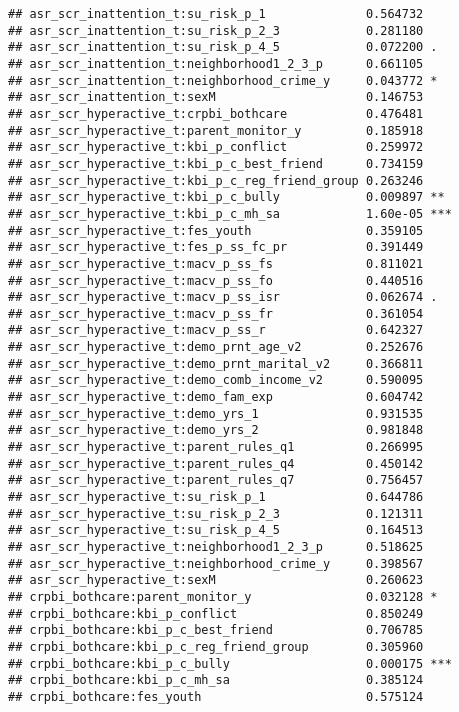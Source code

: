 \documentclass[
]{article}
\begin{document}
\begin{verbatim}
## asr_scr_inattention_t:su_risk_p_1              0.564732    
## asr_scr_inattention_t:su_risk_p_2_3            0.281180    
## asr_scr_inattention_t:su_risk_p_4_5            0.072200 .  
## asr_scr_inattention_t:neighborhood1_2_3_p      0.661105    
## asr_scr_inattention_t:neighborhood_crime_y     0.043772 *  
## asr_scr_inattention_t:sexM                     0.146753    
## asr_scr_hyperactive_t:crpbi_bothcare           0.476481    
## asr_scr_hyperactive_t:parent_monitor_y         0.185918    
## asr_scr_hyperactive_t:kbi_p_conflict           0.259972    
## asr_scr_hyperactive_t:kbi_p_c_best_friend      0.734159    
## asr_scr_hyperactive_t:kbi_p_c_reg_friend_group 0.263246    
## asr_scr_hyperactive_t:kbi_p_c_bully            0.009897 ** 
## asr_scr_hyperactive_t:kbi_p_c_mh_sa            1.60e-05 ***
## asr_scr_hyperactive_t:fes_youth                0.359105    
## asr_scr_hyperactive_t:fes_p_ss_fc_pr           0.391449    
## asr_scr_hyperactive_t:macv_p_ss_fs             0.811021    
## asr_scr_hyperactive_t:macv_p_ss_fo             0.440516    
## asr_scr_hyperactive_t:macv_p_ss_isr            0.062674 .  
## asr_scr_hyperactive_t:macv_p_ss_fr             0.361054    
## asr_scr_hyperactive_t:macv_p_ss_r              0.642327    
## asr_scr_hyperactive_t:demo_prnt_age_v2         0.252676    
## asr_scr_hyperactive_t:demo_prnt_marital_v2     0.366811    
## asr_scr_hyperactive_t:demo_comb_income_v2      0.590095    
## asr_scr_hyperactive_t:demo_fam_exp             0.604742    
## asr_scr_hyperactive_t:demo_yrs_1               0.931535    
## asr_scr_hyperactive_t:demo_yrs_2               0.981848    
## asr_scr_hyperactive_t:parent_rules_q1          0.266995    
## asr_scr_hyperactive_t:parent_rules_q4          0.450142    
## asr_scr_hyperactive_t:parent_rules_q7          0.756457    
## asr_scr_hyperactive_t:su_risk_p_1              0.644786    
## asr_scr_hyperactive_t:su_risk_p_2_3            0.121311    
## asr_scr_hyperactive_t:su_risk_p_4_5            0.164513    
## asr_scr_hyperactive_t:neighborhood1_2_3_p      0.518625    
## asr_scr_hyperactive_t:neighborhood_crime_y     0.398567    
## asr_scr_hyperactive_t:sexM                     0.260623    
## crpbi_bothcare:parent_monitor_y                0.032128 *  
## crpbi_bothcare:kbi_p_conflict                  0.850249    
## crpbi_bothcare:kbi_p_c_best_friend             0.706785    
## crpbi_bothcare:kbi_p_c_reg_friend_group        0.305960    
## crpbi_bothcare:kbi_p_c_bully                   0.000175 ***
## crpbi_bothcare:kbi_p_c_mh_sa                   0.385124    
## crpbi_bothcare:fes_youth                       0.575124    

\end{verbatim}
\end{document}
